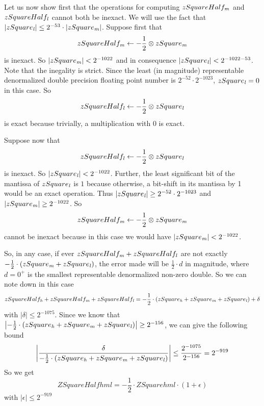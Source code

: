 Let us now show first that the operations for computing $zSquareHalf_{\mathit{m}}$ and $zSquareHalf_{\mathit{l}}$ cannot both be
inexact. We will use the fact that $\left \vert zSquare_{\mathit{l}} \right \vert \leq 2^{-53} \cdot \left \vert zSquare_{\mathit{m}} \right \vert$.
Suppose first that 
$$zSquareHalf_{\mathit{m}} \gets - \frac{1}{2} \otimes zSquare_{\mathit{m}}$$ is inexact. So $\left \vert zSquare_{\mathit{m}} \right \vert < 2^{-1022}$ and
in consequence $\left \vert zSquare_{\mathit{l}} \right \vert < 2^{-1022-53}$. Note that the inegality is strict. 
Since the least (in magnitude) representable denormalized double precision floating point number is $2^{-52} \cdot 2^{-1023}$,
$zSquare_{\mathit{l}} = 0$ in this case. So $$zSquareHalf_{\mathit{l}} \gets - \frac{1}{2} \otimes zSquare_{\mathit{l}}$$ is exact because trivially, a 
multiplication with $0$ is exact. 

Suppose now that $$zSquareHalf_{\mathit{l}} \gets - \frac{1}{2} \otimes zSquare_{\mathit{l}}$$ is inexact. 
So $\left \vert zSquare_{\mathit{l}} \right \vert < 2^{-1022}$. Further, the least significant bit of the mantissa of $zSquare_{\mathit{l}}$ is 
$1$ because otherwise, a bit-shift in its mantissa by 1 would be an exact operation. 
Thus $\left \vert zSquare_{\mathit{l}} \right \vert \geq 2^{-52} \cdot 2^{-1023}$ and $\left \vert zSquare_{\mathit{m}} \right \vert \geq 2^{-1022}$. So
$$zSquareHalf_{\mathit{m}} \gets - \frac{1}{2} \otimes zSquare_{\mathit{m}}$$ cannot be inexact because in this case we would have 
$\left \vert zSquare_{\mathit{m}} \right \vert < 2^{-1022}$. 

So, in any case, if ever $zSquareHalf_{\mathit{m}} + zSquareHalf_{\mathit{l}}$ are not exactly 
$-\frac{1}{2} \cdot \left( zSquare_{\mathit{m}} + zSquare_{\mathit{l}} \right)$, the error made will be $\frac{1}{2} \cdot d$
in magnitude, where $d = 0^+$ is the smallest representable denormalized non-zero double. So we can note down in this case
$$zSquareHalf_{\mathit{h}} + zSquareHalf_{\mathit{m}} + zSquareHalf_{\mathit{l}} = - \frac{1}{2} \cdot \left( zSquare_{\mathit{h}} + zSquare_{\mathit{m}} + zSquare_{\mathit{l}} \right) + \delta$$
with $\left \vert \delta \right \vert \leq 2^{-1075}$. Since we know that
$\left \vert - \frac{1}{2} \cdot \left( zSquare_{\mathit{h}} + zSquare_{\mathit{m}} + zSquare_{\mathit{l}} \right) \right \vert \geq 2^{-156}$, we can give the
following bound
$$\left \vert \frac{\delta}{-\frac{1}{2} \cdot \left( zSquare_{\mathit{h}} + zSquare_{\mathit{m}} + zSquare_{\mathit{l}} \right)} \right \vert \leq 
\frac{2^{-1075}}{2^{-156}} = 2^{-919}$$
So we get
$$ZSquareHalfhml = - \frac{1}{2} \cdot ZSquarehml \cdot \left(1 + \epsilon\right)$$
with
$\left \vert \epsilon \right \vert \leq 2^{-919}$ 


